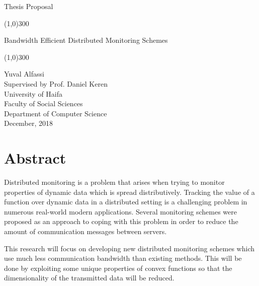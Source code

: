 \documentclass[11pt, conference]{article}
\begin{document}
	\begin{titlepage}
		\begin{center}
			\vspace*{1cm}
			\begin{Huge}
				Thesis Proposal \\
			\end{Huge}
			\vspace{1cm}
			\line(1,0){300} \\
			\vspace{0.2cm}
			\begin{Huge}
				Bandwidth Efficient Distributed Monitoring Schemes \\
			\end{Huge}
			\line(1,0){300} \\
			\vspace{1.5cm}
			\begin{Large}
				Yuval Alfassi \\
			\vspace{1cm}
				Supervised by Prof. Daniel Keren \\
			\vspace{2.5cm}
				University of Haifa \\
				Faculty of Social Sciences \\
				Department of Computer Science \\
			\vspace{1.5cm}
				December, 2018 \\
			\end{Large}
		\end{center}
	\end{titlepage}


\section*{Abstract}

Distributed monitoring is a problem that arises when trying to monitor properties of dynamic data which is spread distributively. Tracking the value of a function over dynamic data in a distributed setting is a challenging problem in numerous real-world modern applications. Several monitoring schemes were proposed as an approach to coping with this problem in order to reduce the amount of communication messages between servers.

This research will focus on developing new distributed monitoring schemes which use much less communication bandwidth than existing methods. This will be done by exploiting some unique properties of convex functions so that the dimensionality of the transmitted data will be reduced.
\end{document}
